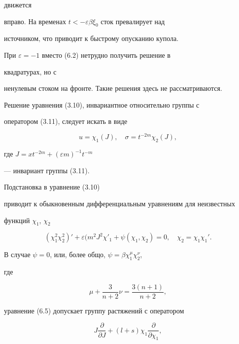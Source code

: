 движется


вправо. На временах $t<-\varepsilon\beta\xi_0$ сток превалирует над


источником, что приводит к быстрому опусканию купола.





При $\varepsilon=-1$ вместо (6.2) нетрудно получить решение в


квадратурах, но с


ненулевым стоком на фронте. Такие решения здесь не рассматриваются.





Решение уравнения (3.10), инвариантное относительно группы с


оператором (3.11), следует искать в виде


\begin{equation}


u=\chi_1(J),\quad \sigma=t^{-2m}\chi_2(J),


\end{equation}


где $J=xt^{-2m}+(\varepsilon m)^{-1}t^{-m}$


--- инвариант группы (3.11).


Подстановка в уравнение (3.10)


приводит к обыкновенным дифференциальным уравнениям для неизвестных


функций $\chi_1$, $\chi_2$


\begin{equation}


(\chi^2_1\chi^2_2)'+\varepsilon(m^2J^2\chi'_1+\psi


(\chi_1,\chi_2)=0,\quad \chi_2=\chi_1\chi_1'.


\end{equation}


В случае $\psi=0$, или, более общо, $\psi=\beta\chi^\mu_1\chi^\nu_2$,


где


$$


\mu+\frac{3}{n+2}\nu=\frac{3(n+1)}{n+2},


$$


уравнение (6.5) допускает группу растяжений с оператором


$$


J\frac{\partial}{\partial J}+(l+s)\chi_1


\frac{\partial}{\partial\chi_1},


$$


